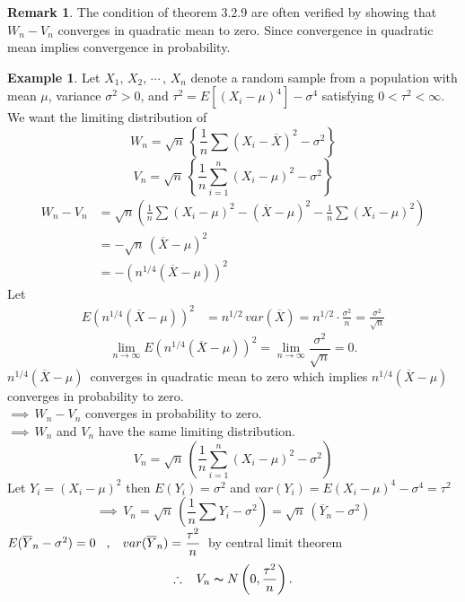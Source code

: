 \documentclass[12pt,a4paper]{report}
\theoremstyle{definition}
\newtheorem{exa}[thm]{Example}
\newtheorem{remark}[thm]{Remark}
\theoremstyle{plain}
\begin{document}
\begin{remark}
The condition of theorem 3.2.9 are often verified by showing that $W_n - V_n$ converges in quadratic mean to zero. Since convergence in quadratic mean implies convergence in probability.
\end{remark}



\begin{exa}
Let $X_1, \, X_2, \, \cdots\, , \, X_n$ denote a random sample from a population with mean $\mu$, variance $\sigma^2>0$, and $\tau^2 = E\left[(X_i - \mu)^4\right] - \sigma^4$ satisfying $0 < \tau^2 < \infty$. We want the limiting distribution of $$W_n = \sqrt{n}\, \left\{\frac{1}{n}\sum \left(X_i - \overline{X}\right)^2 - \sigma^2\right\}$$
$$V_n = \sqrt{n}\, \left\{\frac{1}{n}\sum^n_{i = 1} (X_i - \mu)^2 - \sigma^2\right\}$$
\begin{align*}
W_n - V_n & = \sqrt{n} \left(\frac{1}{n}\sum(X_i - \mu)^2 - (\overline{X} - \mu)^2 - \frac{1}{n}\sum(X_i - \mu)^2\right)\\
& = -\sqrt{n}\, (\overline{X} - \mu)^2\\
& = - \left(n^{1/4}(\overline{X}- \mu)\right)^2
\end{align*}
Let
\begin{align*}
E\left(n^{1/4}(\overline{X} - \mu)\right)^2 & = n^{1/2}\, var(\overline{X}) = n^{1/2}\cdot\frac{\sigma^2}{n} = \frac{\sigma^2}{\sqrt{n}}
\end{align*}
$$\lim_{n\rightarrow\infty}E\left(n^{1/4}(\overline{X} - \mu)\right)^2 = \lim_{n\rightarrow\infty}\frac{\sigma^2}{\sqrt{n}} = 0.$$
$n^{1/4}(\overline{X} - \mu)\, $ converges in quadratic mean to zero which implies $n^{1/4}(\overline{X} - \mu)\,$ converges in probability to zero.\\
$\implies\, W_n - V_n$ converges in probability to zero.\\
$\implies\, W_n$ and $V_n$ have the same limiting distribution.
$$V_n = \sqrt{n}\, \left(\frac{1}{n}\sum^n_{i = 1} (X_i - \mu)^2 - \sigma^2\right)$$
Let $Y_i  = (X_i - \mu)^2$ then $E(Y_i) = \sigma^2$ and $var(Y_i) = E(X_i - \mu)^4 - \sigma^4 = \tau^2$
$$\implies\, V_n = \sqrt{n}\, \left(\frac{1}{n}\sum Y_i - \sigma^2\right) = \sqrt{n}\, \left(\overline{Y}_n - \sigma^2\right)$$
$E(\overline{Y}_n - \sigma^2) = 0\hspace{0.3cm}, \hspace{0.3cm} var(\overline{Y}_n) = \dfrac{\tau^2}{n}\,$ by central limit theorem 
$$\therefore\hspace{0.3cm} V_n \thicksim N\left(0,\frac{\tau^2}{n}\right).$$
\end{exa}
\end{document}
